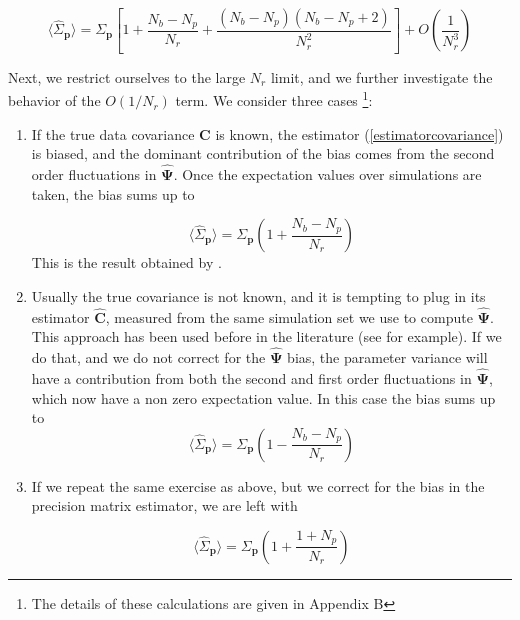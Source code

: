 \documentclass[reprint,aps,prd,superscriptaddress,showkeys,showpacs]{revtex4-1}
\newcommand{\bb}[1]{\mathbf{#1}}
\newcommand{\bbh}[1]{\mathbf{\hat{#1}}}
\newcommand{\h}[1]{\hat{#1}}
\begin{document}
\begin{widetext}
\begin{equation}
\label{quarticdegradation}
\langle\h{\Sigma}_\bb{p}\rangle = \Sigma_\bb{p}\left[1+\frac{N_b-N_p}{N_r}+\frac{(N_b-N_p)(N_b-N_p+2)}{N_r^2}\right] + O\left(\frac{1}{N_r^3}\right)
\end{equation}
\end{widetext}
%
Next, we restrict ourselves to the large $N_r$ limit, and we further investigate the behavior of the $O(1/N_r)$ term. We consider three cases \footnote{The details of these calculations are given in Appendix B}:
\begin{enumerate}
\item If the true data covariance $\bb{C}$ is known, the estimator (\ref{estimatorcovariance}) is biased, and the dominant contribution of the bias comes from the second order fluctuations in $\bbh{\Psi}$. Once the expectation values over simulations are taken, the bias sums up to 

\begin{equation}
\label{dodelsonscaling}
\langle\h{\Sigma}_\bb{p}\rangle=\Sigma_\bb{p}\left(1+\frac{N_b-N_p}{N_r}\right)
\end{equation}
%
This is the result obtained by \citep{DodelsonSchneider13}.

\item Usually the true covariance is not known, and it is tempting to plug in its estimator $\bbh{C}$, measured from the same simulation set we use to compute $\bbh{\Psi}$. This approach has been used before in the literature (see \citep{MinkPetri,MinkShirasaki} for example). If we do that, and we do not correct for the $\bbh{\Psi}$ bias, the parameter variance will have a contribution from both the second and first order fluctuations in $\bbh{\Psi}$, which now have a non zero expectation value. In this case the bias sums up to 
\begin{equation}
\label{mockscalinguncorrected}
\langle\h{\Sigma}_\bb{p}\rangle=\Sigma_\bb{p}\left(1-\frac{N_b-N_p}{N_r}\right)
\end{equation}

\item If we repeat the same exercise as above, but we correct for the bias in the precision matrix estimator, we are left with 

\begin{equation}
\label{mockscalingcorrected}
\langle\h{\Sigma}_\bb{p}\rangle=\Sigma_\bb{p}\left(1+\frac{1+N_p}{N_r}\right)
\end{equation}

\end{enumerate} 
\end{document}
